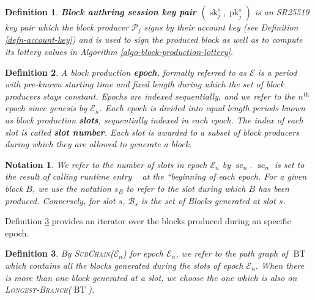 \documentclass{article}
\newcommand{\tmname}[1]{\textsc{#1}}
\newcommand{\tmop}[1]{\ensuremath{\operatorname{#1}}}
\newcommand{\tmstrong}[1]{\textbf{#1}}
\newcommand{\tmtextbf}[1]{{\bfseries{#1}}}
\newcommand{\tmtextsc}[1]{{\scshape{#1}}}
\newcommand{\tmtexttt}[1]{{\ttfamily{#1}}}
\newcommand{\tmverbatim}[1]{{\ttfamily{#1}}}
\newtheorem{definition}{Definition}
\newtheorem{notation}{Notation}
\providecommand{\tmname}[1]{\tmtextsc{#1}}
\providecommand{\tmop}[1]{\ensuremath{\mathrm{#1}}}
\providecommand{\tmstrong}[1]{\tmtextbf{#1}}
\providecommand{\tmtextbf}[1]{\tmtextbf{#1}}
\providecommand{\tmverbatim}[1]{\tmtexttt{#1}}
\newtheorem{definition}{Definition}
\newtheorem{notation}{Notation}
\begin{document}
\begin{definition}
  {\tmstrong{Block authring session key pair $(\tmop{sk}^s_j,
  \tmop{pk}^s_j)$}} is an SR25519 key pair which the block producer
  $\mathcal{P}_j$ signs by their account key (see Definition
  \ref{defn-account-key}) and is used to sign the produced block as well as to
  compute its lottery values in Algorithm \ref{algo-block-production-lottery}.
  
\end{definition}

\begin{definition}
  \label{defn-epoch-slot}A block production {\tmstrong{epoch}}, formally
  referred to as $\mathcal{E}$ is a period with pre-known starting time and
  fixed length during which the set of block producers stays constant. Epochs
  are indexed sequentially, and we refer to the $n^{\tmop{th}}$ epoch since
  genesis by $\mathcal{E}_n$. Each epoch is divided into equal length periods
  known as block production {\tmstrong{slots}}, sequentially indexed in each
  epoch. The index of each slot is called {\tmstrong{slot number}}. Each slot
  is awarded to a subset of block producers during which they are allowed to
  generate a block.
\end{definition}

\begin{notation}
  \label{note-slot}We refer to the number of slots in epoch $\mathcal{E}_n$ by
  $\tmop{sc}_n$. $\tmop{sc}_n$ is set to the result of calling runtime entry \
  \tmverbatim{BabeApi\_slot\_duration} at the ``beginning of each epoch. For a
  given block $B$, we use the notation {\tmstrong{$s_B$}} to refer to the slot
  during which $B$ has been produced. Conversely, for slot $s$,
  $\mathcal{B}_s$ is the set of Blocks generated at slot $s$.
\end{notation}

Definition \ref{defn-epoch-subchain} provides an iterator over the blocks
produced during an specific epoch.

\begin{definition}
  \label{defn-epoch-subchain} By {\tmname{SubChain($\mathcal{E}_n$)}} for
  epoch $\mathcal{E}_n$, we refer to the path graph of $\tmop{BT}$ which
  contains all the blocks generated during the slots of epoch $\mathcal{E}_n$.
  When there is more than one block generated at a slot, we choose the one
  which is also on {\tmname{Longest-Branch($\tmop{BT}$)}}.
\end{definition}
\end{document}
